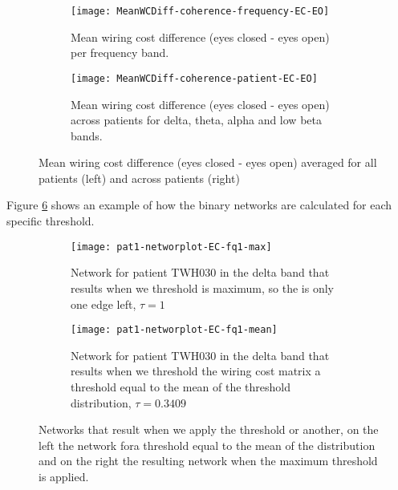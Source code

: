 \documentclass[11pt, onecolumn]{article}
\begin{document}
\begin{figure}[ht] 
  \begin{subfigure}[t]{0.5\linewidth}
    \centering
    \texttt{[image: MeanWCDiff-coherence-frequency-EC-EO]} 
    \caption{Mean wiring cost difference (eyes closed - eyes open) per frequency band.} 
    \label{fig0:a} 
    \vspace{4ex}
  \end{subfigure}%
  \hspace{1ex}
  \begin{subfigure}[t]{0.5\linewidth}
    \centering
    \texttt{[image: MeanWCDiff-coherence-patient-EC-EO]} 
    \caption{Mean wiring cost difference (eyes closed - eyes open) across patients for delta, theta, alpha and low beta bands.} 
    \label{fig0:b} 
    \vspace{4ex}
  \end{subfigure} 
  \caption{Mean wiring cost difference (eyes closed - eyes open) averaged for all patients (left) and across patients (right)}
  \label{fig:meanwcindivpats} 
\end{figure}

Figure \ref{fig:binaryplotnetwork} shows an example of how the binary networks are calculated for each specific threshold.
\begin{figure}[ht] 
  \begin{subfigure}[t]{0.5\linewidth}
    \centering
    \texttt{[image: pat1-networplot-EC-fq1-max]} 
    \caption{Network for patient TWH030 in the delta band that results when we threshold is maximum, so the is only one edge left,  $\tau = 1$} 
    \label{binaryplotnetwork:a} 
    \vspace{4ex}
  \end{subfigure}%
  \hspace{1ex}
  \begin{subfigure}[t]{0.5\linewidth}
    \centering
    \texttt{[image: pat1-networplot-EC-fq1-mean]} 
    \caption{Network for patient TWH030 in the delta band that results when we threshold the wiring cost matrix a threshold equal to the mean of the threshold distribution, $\tau =  0.3409$}
    \label{binaryplotnetwork:b} 
    \vspace{4ex}
  \end{subfigure} 
  \caption{Networks that result when we apply the threshold or another, on the left the network fora threshold equal to the  mean of the distribution and on the right the resulting network when the maximum threshold is applied.}
  \label{fig:binaryplotnetwork} 
\end{figure}
\end{document}
